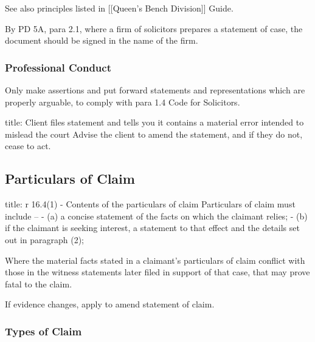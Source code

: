 \documentclass[
]{article}
\newenvironment{Shaded}{}{}
\newcommand{\NormalTok}[1]{#1}
\begin{document}
See also principles listed in {[}{[}Queen's Bench Division{]}{]} Guide.

By PD 5A, para 2.1, where a firm of solicitors prepares a statement of
case, the document should be signed in the name of the firm.

\hypertarget{professional-conduct-1}{%
\subsubsection{Professional Conduct}\label{professional-conduct-1}}

Only make assertions and put forward statements and representations
which are properly arguable, to comply with para 1.4 Code for
Solicitors.

\begin{Shaded}
\begin{Highlighting}[]
\NormalTok{title: Client files statement and tells you it contains a material error intended to mislead the court }
\NormalTok{Advise the client to amend the statement, and if they do not, cease to act. }
\end{Highlighting}
\end{Shaded}

\hypertarget{particulars-of-claim-1}{%
\subsection{Particulars of Claim}\label{particulars-of-claim-1}}

\begin{Shaded}
\begin{Highlighting}[]
\NormalTok{title: r 16.4(1) {-} Contents of the particulars of claim}
\NormalTok{Particulars of claim must include –}
\NormalTok{{-} (a) a concise statement of the facts on which the claimant relies;}
\NormalTok{{-} (b) if the claimant is seeking interest, a statement to that effect and the details set out in paragraph (2);}
\end{Highlighting}
\end{Shaded}

Where the material facts stated in a claimant's particulars of claim
conflict with those in the witness statements later filed in support of
that case, that may prove fatal to the claim.

If evidence changes, apply to amend statement of claim.

\hypertarget{types-of-claim}{%
\subsubsection{Types of Claim}\label{types-of-claim}}
\end{document}
